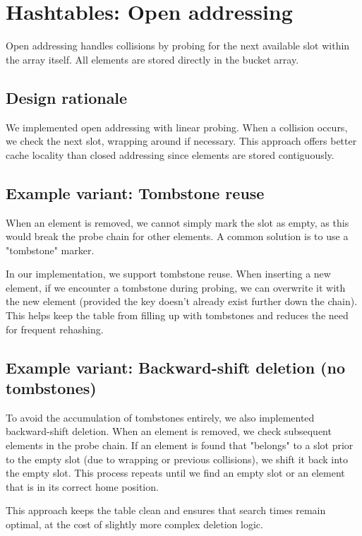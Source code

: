 \chapter{Hashtables: Open addressing}\label{chap:hashtables:open}

Open addressing handles collisions by probing for the next available slot within the array itself. All elements are stored directly in the bucket array.

\section{Design rationale}

We implemented open addressing with linear probing. When a collision occurs, we check the next slot, wrapping around if necessary. This approach offers better cache locality than closed addressing since elements are stored contiguously.

\section{Example variant: Tombstone reuse}

When an element is removed, we cannot simply mark the slot as empty, as this would break the probe chain for other elements. A common solution is to use a "tombstone" marker.

In our implementation, we support tombstone reuse. When inserting a new element, if we encounter a tombstone during probing, we can overwrite it with the new element (provided the key doesn't already exist further down the chain). This helps keep the table from filling up with tombstones and reduces the need for frequent rehashing.

\section{Example variant: Backward-shift deletion (no tombstones)}

To avoid the accumulation of tombstones entirely, we also implemented backward-shift deletion. When an element is removed, we check subsequent elements in the probe chain. If an element is found that "belongs" to a slot prior to the empty slot (due to wrapping or previous collisions), we shift it back into the empty slot. This process repeats until we find an empty slot or an element that is in its correct home position.

This approach keeps the table clean and ensures that search times remain optimal, at the cost of slightly more complex deletion logic.

